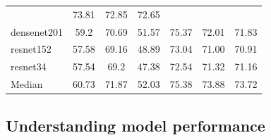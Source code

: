 \begin{table}[H]
\begin{tabular}{lcccccc}
                                & 73.81          & 72.85          & 72.65
        \\
        densenet201             & 59.2           & 70.69          & 51.57
                                & 75.37          & 72.01          & 71.83
        \\
        resnet152               & 57.58          & 69.16          & 48.89
                                & 73.04          & 71.00          &
        70.91
        \\
        resnet34                & 57.54          & 69.2           & 47.38
                                & 72.54          & 71.32          & 71.16
        \\
        \hdashline
        Median                  & 60.73          & 71.87          & 52.03
                                & 75.38          & 73.88          & 73.72
        \\
        \bottomrule
    \end{tabular}
\end{table}

\subsection{Understanding model performance}

